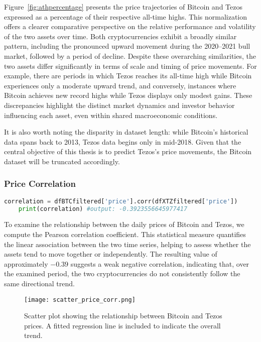Figure~\ref{fig:athpercentage} presents the price trajectories of Bitcoin and Tezos expressed as a percentage of their respective all-time highs.
This normalization offers a clearer comparative perspective on the relative performance and volatility of the two assets over time. Both cryptocurrencies exhibit a broadly similar pattern, including the pronounced upward movement during the 2020–2021 bull market, followed by a period of decline.
Despite these overarching similarities, the two assets differ significantly in terms of scale and timing of price movements.
For example, there are periods in which Tezos reaches its all-time high while Bitcoin experiences only a moderate upward trend, and conversely, instances where Bitcoin achieves new record highs while Tezos displays only modest gains. These discrepancies highlight the distinct market dynamics and investor behavior influencing each asset, even within shared macroeconomic conditions.

It is also worth noting the disparity in dataset length: while Bitcoin’s historical data spans back to 2013, Tezos data begins only in mid-2018. Given that the central objective of this thesis is to predict Tezos’s price movements, the Bitcoin dataset will be truncated accordingly.

\subsubsection{Price Correlation}
\label{sec:pricecorrelation}

\begin{lstlisting}[language=Python, caption={Correlation matrix}, label={lst:correlation}]
    correlation = dfBTCfiltered['price'].corr(dfXTZfiltered['price'])
    print(correlation) #output: -0.3923556645977417
\end{lstlisting}
To examine the relationship between the daily prices of Bitcoin and Tezos, we compute the Pearson correlation coefficient.
This statistical measure quantifies the linear association between the two time series, helping to assess whether the assets tend to move together or independently. The resulting value of approximately $-0.39$ suggests a weak negative correlation, indicating that, over the examined period, the two cryptocurrencies do not consistently follow the same directional trend.

\begin{figure}[H]
    \centering
    \texttt{[image: scatter\_price\_corr.png]}
    \caption{Scatter plot showing the relationship between Bitcoin and Tezos prices. A fitted regression line is included to indicate the overall trend.}
    \label{fig:price_scatter}
\end{figure}

